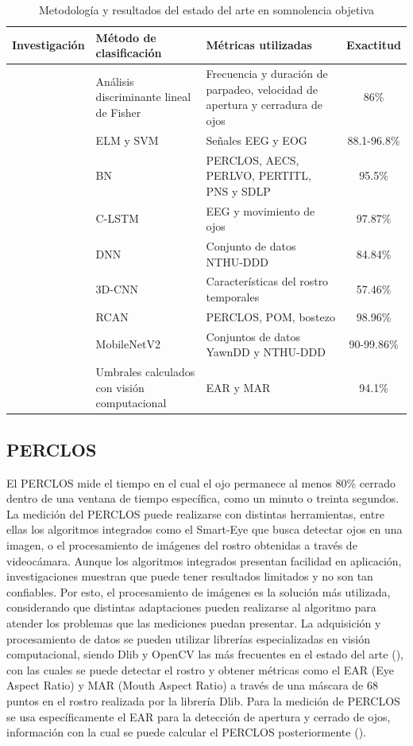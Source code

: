 \begin{table}[h!]
    \centering
    \footnotesize
    \renewcommand{\arraystretch}{1.8} 
    \begin{tabularx}{\textwidth}{c X X c}
        Investigación & Método de clasificación & Métricas utilizadas & Exactitud \\
        \hline
        \cite{Drowsiness_CV} & Análisis discriminante lineal de Fisher & Frecuencia y duración de parpadeo, velocidad de apertura y cerradura de ojos & 86\% \\
        \cite{EEG_SVM} & ELM y SVM & Señales EEG y EOG & 88.1-96.8\% \\
        \cite{bayesianNetwork} & BN & PERCLOS, AECS, PERLVO, PERTITL, PNS y SDLP & 95.5\% \\
        \cite{LSTM} & C-LSTM & EEG y movimiento de ojos & 97.87\% \\
        \cite{DNN} & DNN & Conjunto de datos NTHU-DDD & 84.84\% \\
        \cite{3D-CNN} & 3D-CNN & Características del rostro temporales & 57.46\% \\
        \cite{RCAN} & RCAN & PERCLOS, POM, bostezo & 98.96\% \\
        \cite{MobileNet} & MobileNetV2 & Conjuntos de datos YawnDD y NTHU-DDD & 90-99.86\% \\
        \cite{DyS-VC} & Umbrales calculados con visión computacional & EAR y MAR & 94.1\% \\
        \hline
    \end{tabularx}
    \caption{Metodología y resultados del estado del arte en somnolencia objetiva}
    \label{tab:Objetivas}
\end{table}


\subsection{PERCLOS}
El PERCLOS mide el tiempo en el cual el ojo permanece al menos 80\% cerrado dentro de una ventana de tiempo específica, como un minuto o treinta segundos. La medición del PERCLOS puede realizarse con distintas herramientas, entre ellas los algoritmos integrados como el Smart-Eye que busca detectar ojos en una imagen, o el procesamiento de imágenes del rostro obtenidas a través de videocámara. Aunque los algoritmos integrados presentan facilidad en aplicación, investigaciones muestran que puede tener resultados limitados y no son tan confiables. Por esto, el procesamiento de imágenes es la solución más utilizada, considerando que distintas adaptaciones pueden realizarse al algoritmo para atender los problemas que las mediciones puedan presentar. La adquisición y procesamiento de datos se pueden utilizar librerías especializadas en visión computacional, siendo Dlib y OpenCV las más frecuentes en el estado del arte (\cite{MinhasPERCLOS}), con las cuales se puede detectar el rostro y obtener métricas como el EAR (Eye Aspect Ratio) y MAR (Mouth Aspect Ratio) a través de una máscara de 68 puntos en el rostro realizada por la librería Dlib. Para la medición de PERCLOS se usa específicamente el EAR para la detección de apertura y cerrado de ojos, información con la cual se puede calcular el PERCLOS posteriormente (\cite{MinhasPERCLOS}).

